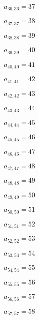 \documentclass[a4paper,12pt]{article}
\begin{document}
$a _{ 36, 36 } = 37$

$a _{ 37, 37 } = 38$

$a _{ 38, 38 } = 39$

$a _{ 39, 39 } = 40$

$a _{ 40, 40 } = 41$

$a _{ 41, 41 } = 42$

$a _{ 42, 42 } = 43$

$a _{ 43, 43 } = 44$

$a _{ 44, 44 } = 45$

$a _{ 45, 45 } = 46$

$a _{ 46, 46 } = 47$

$a _{ 47, 47 } = 48$

$a _{ 48, 48 } = 49$

$a _{ 49, 49 } = 50$

$a _{ 50, 50 } = 51$

$a _{ 51, 51 } = 52$

$a _{ 52, 52 } = 53$

$a _{ 53, 53 } = 54$

$a _{ 54, 54 } = 55$

$a _{ 55, 55 } = 56$

$a _{ 56, 56 } = 57$

$a _{ 57, 57 } = 58$
\end{document}
